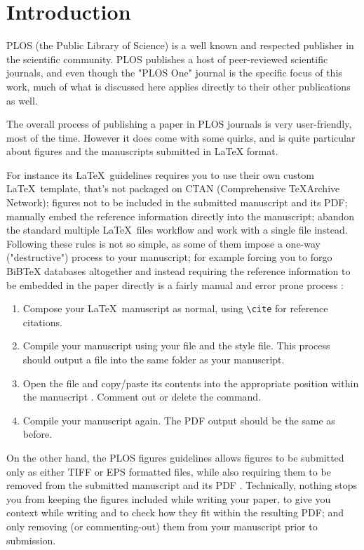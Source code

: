 \section*{Introduction}

PLOS (the Public Library of Science) is a well known and respected publisher in the scientific community.
PLOS publishes a host of peer-reviewed scientific journals, and even though the "PLOS One" journal is the specific focus of this work, much of what is discussed here applies directly to their other publications as well.

The overall process of publishing a paper in PLOS journals is very user-friendly, most of the time.
However it does come with some quirks, and is quite particular about figures and the manuscripts submitted in \LaTeX \cite{LaTeX} format.

For instance its \LaTeX~guidelines \cite{PLOS:LaTeX} requires you to
use their own custom \LaTeX~template, that's not packaged \cite{CTAN:plos} on CTAN (Comprehensive \TeX Archive Network);
figures not to be included in the submitted  manuscript and its PDF;
manually embed the reference information directly into the  manuscript;
abandon the standard multiple \LaTeX~files workflow and work with a single  file instead.
Following these rules is not so simple, as some of them impose a one-way ("destructive") process to your manuscript; for example forcing you to forgo BiBTeX databases altogether and instead requiring the reference information to be embedded in the paper directly is a fairly manual and error prone process \cite{PLOS:LaTeX}:
\begin{enumerate}
    \item Compose your \LaTeX~manuscript as normal, using \verb|\cite| for reference citations.
    \item Compile your manuscript using your  file and the  style file. This process should output a  file into the same folder as your manuscript.
    \item Open the  file and copy/paste its contents into the appropriate position within the manuscript . Comment out or delete the  command.
    \item Compile your manuscript again. The PDF output should be the same as before.
\end{enumerate}

On the other hand, the PLOS figures guidelines \cite{PLOS:Figures} allows figures to be submitted only as either TIFF or EPS formatted files, while also requiring them to be removed from the submitted  manuscript and its PDF \cite{PLOS:LaTeX}.
Technically, nothing stops you from keeping the figures included while writing your paper, to give you context while writing and to check how they fit within the resulting PDF; and only removing (or commenting-out) them from your  manuscript prior to submission.


